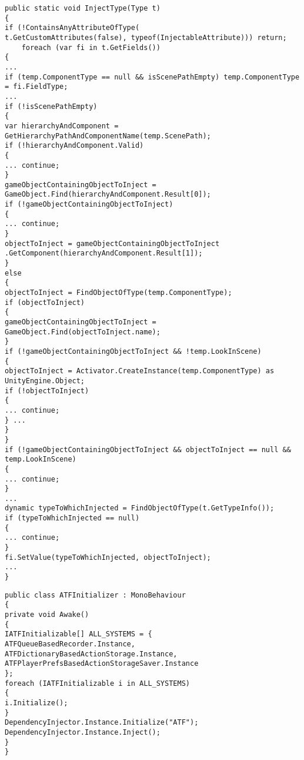 \begin{lstlisting}[caption={Метод инъекции зависимостей в экземпляр класса типа},label=injectType]
public static void InjectType(Type t)
{
if (!ContainsAnyAttributeOfType(
t.GetCustomAttributes(false), typeof(InjectableAttribute))) return;
	foreach (var fi in t.GetFields())
{
...
if (temp.ComponentType == null && isScenePathEmpty) temp.ComponentType = fi.FieldType;
...
if (!isScenePathEmpty)
{
var hierarchyAndComponent = GetHierarchyPathAndComponentName(temp.ScenePath);
if (!hierarchyAndComponent.Valid)
{
... continue;
} 
gameObjectContainingObjectToInject = GameObject.Find(hierarchyAndComponent.Result[0]);
if (!gameObjectContainingObjectToInject)
{
... continue;
}
objectToInject = gameObjectContainingObjectToInject
.GetComponent(hierarchyAndComponent.Result[1]);
}
else
{
objectToInject = FindObjectOfType(temp.ComponentType);
if (objectToInject)
{
gameObjectContainingObjectToInject = GameObject.Find(objectToInject.name);
}
if (!gameObjectContainingObjectToInject && !temp.LookInScene)
{
objectToInject = Activator.CreateInstance(temp.ComponentType) as UnityEngine.Object;
if (!objectToInject)
{
... continue;
} ...
}
}
if (!gameObjectContainingObjectToInject && objectToInject == null && temp.LookInScene)
{
... continue;
}
...
dynamic typeToWhichInjected = FindObjectOfType(t.GetTypeInfo());
if (typeToWhichInjected == null)
{
... continue;
}
fi.SetValue(typeToWhichInjected, objectToInject);
...
}
\end{lstlisting}

\begin{lstlisting}[caption={Бизнес-логика базовой системы интеграции},label=initializer]
public class ATFInitializer : MonoBehaviour
{
private void Awake()
{
IATFInitializable[] ALL_SYSTEMS = {
ATFQueueBasedRecorder.Instance, 
ATFDictionaryBasedActionStorage.Instance,
ATFPlayerPrefsBasedActionStorageSaver.Instance
};
foreach (IATFInitializable i in ALL_SYSTEMS)
{
i.Initialize();
}
DependencyInjector.Instance.Initialize("ATF");
DependencyInjector.Instance.Inject();
}
}
\end{lstlisting}

